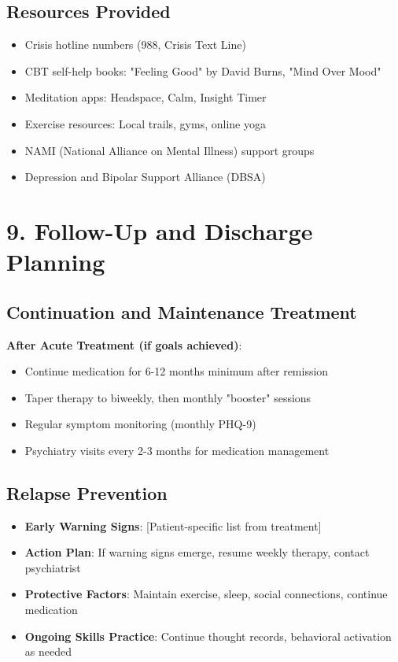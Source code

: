 \documentclass[11pt,letterpaper]{article}
\begin{document}
\subsection*{Resources Provided}

\begin{itemize}[leftmargin=*]
    \item Crisis hotline numbers (988, Crisis Text Line)
    \item CBT self-help books: "Feeling Good" by David Burns, "Mind Over Mood"
    \item Meditation apps: Headspace, Calm, Insight Timer
    \item Exercise resources: Local trails, gyms, online yoga
    \item NAMI (National Alliance on Mental Illness) support groups
    \item Depression and Bipolar Support Alliance (DBSA)
\end{itemize}

\section*{9. Follow-Up and Discharge Planning}

\subsection*{Continuation and Maintenance Treatment}

\textbf{After Acute Treatment (if goals achieved)}:
\begin{itemize}[leftmargin=*]
    \item Continue medication for 6-12 months minimum after remission
    \item Taper therapy to biweekly, then monthly "booster" sessions
    \item Regular symptom monitoring (monthly PHQ-9)
    \item Psychiatry visits every 2-3 months for medication management
\end{itemize}

\subsection*{Relapse Prevention}

\begin{itemize}[leftmargin=*]
    \item \textbf{Early Warning Signs}: [Patient-specific list from treatment]
    \item \textbf{Action Plan}: If warning signs emerge, resume weekly therapy, contact psychiatrist
    \item \textbf{Protective Factors}: Maintain exercise, sleep, social connections, continue medication
    \item \textbf{Ongoing Skills Practice}: Continue thought records, behavioral activation as needed
\end{itemize}
\end{document}
